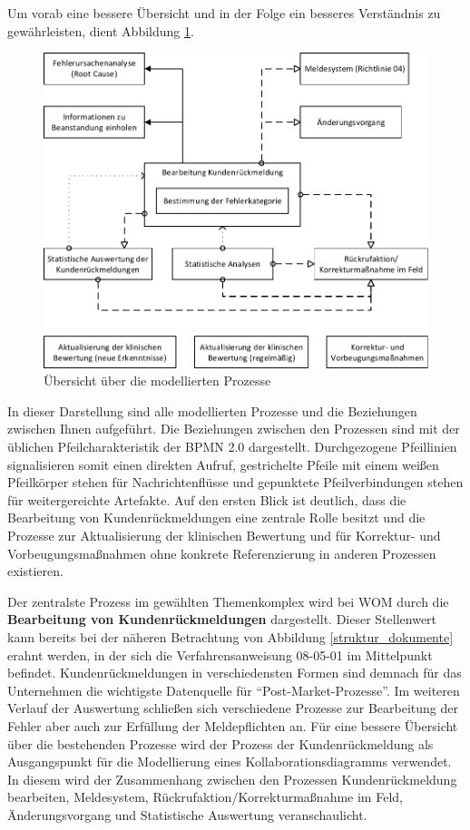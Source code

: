 \documentclass[a4paper,12pt]{report}
\begin{document}
Um vorab eine bessere Übersicht und in der Folge ein besseres Verständnis zu gewährleisten, dient Abbildung \ref{process_overview}.
\begin{figure}[ht]
\centering
\noindent\includegraphics[width=\linewidth,height=\textheight,
keepaspectratio]{Images/process_overview}
\caption[Übersicht über die modellierten Prozesse]{Übersicht über die modellierten Prozesse}
\label{process_overview}
\end{figure}
In dieser Darstellung sind alle modellierten Prozesse und die Beziehungen zwischen Ihnen aufgeführt. Die Beziehungen zwischen den Prozessen sind mit der üblichen Pfeilcharakteristik der BPMN 2.0 dargestellt. Durchgezogene Pfeillinien signalisieren somit einen direkten Aufruf, gestrichelte Pfeile mit einem weißen Pfeilkörper stehen für Nachrichtenflüsse und gepunktete Pfeilverbindungen stehen für weitergereichte Artefakte. Auf den ersten Blick ist deutlich, dass die Bearbeitung von Kundenrückmeldungen eine zentrale Rolle besitzt und die Prozesse zur Aktualisierung der klinischen Bewertung und für Korrektur- und Vorbeugungsmaßnahmen ohne konkrete Referenzierung in anderen Prozessen existieren.

Der zentralste Prozess im gewählten Themenkomplex wird bei WOM durch die \textbf{Bearbeitung von Kundenrückmeldungen} dargestellt. Dieser Stellenwert kann bereits bei der näheren Betrachtung von Abbildung \ref{struktur_dokumente} erahnt werden, in der sich die Verfahrensanweisung 08-05-01 im Mittelpunkt befindet. Kundenrückmeldungen in verschiedensten Formen sind demnach für das Unternehmen die wichtigste Datenquelle für "`Post-Market-Prozesse"'. Im weiteren Verlauf der Auswertung schließen sich verschiedene Prozesse zur Bearbeitung der Fehler aber auch zur Erfüllung der Meldepflichten an. Für eine bessere Übersicht über die bestehenden Prozesse wird der Prozess der Kundenrückmeldung als Ausgangspunkt für die Modellierung eines Kollaborationsdiagramms verwendet. In diesem wird der Zusammenhang zwischen den Prozessen Kundenrückmeldung bearbeiten, Meldesystem, Rückrufaktion/Korrekturmaßnahme im Feld, Änderungsvorgang und Statistische Auswertung veranschaulicht.
\end{document}
